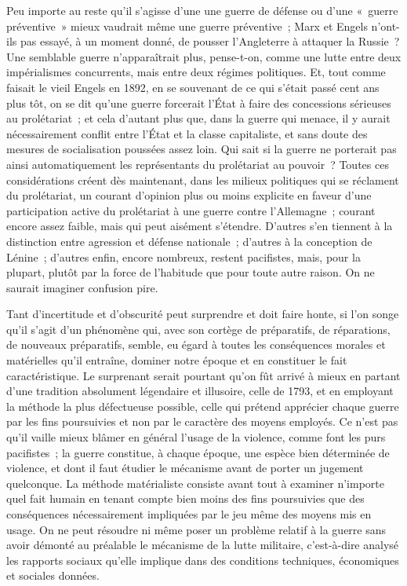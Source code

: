 \documentclass[french,twoside]{book} %
\begin{document}
Peu importe au reste qu'il s’agisse d'une une guerre de défense ou d’une « guerre préventive » mieux vaudrait même une guerre préventive ; Marx et Engels n'ont-ils pas essayé, à un moment donné, de pousser l'Angleterre à attaquer la Russie ? Une semblable guerre n'apparaîtrait plus, pense-t-on, com­me une lutte entre deux impérialismes concurrents, mais entre deux régimes politiques. Et, tout comme faisait le vieil Engels en 1892, en se souvenant de ce qui s'était passé cent ans plus tôt, on se dit qu'une guerre forcerait l'État à faire des concessions sérieuses au prolétariat ; et cela d'autant plus que, dans la guerre qui menace, il y aurait nécessairement conflit entre l'État et la classe capitaliste, et sans doute des mesures de socialisation poussées assez loin. Qui sait si la guerre ne porterait pas ainsi automatiquement les représentants du prolétariat au pouvoir ? Toutes ces considérations créent dès maintenant, dans les milieux politiques qui se réclament du prolétariat, un courant d'opinion plus ou moins explicite en faveur d'une participation active du prolétariat à une guerre contre l'Allemagne ; courant encore assez faible, mais qui peut aisément s'étendre. D'autres s'en tiennent à la distinction entre agression et défense nationale ; d'autres à la conception de Lénine ; d'autres enfin, encore nombreux, restent pacifistes, mais, pour la plupart, plutôt par la force de l'habitude que pour toute autre raison. On ne saurait imaginer confusion pire.\par
Tant d'incertitude et d'obscurité peut surprendre et doit faire honte, si l'on songe qu'il s'agit d'un phénomène qui, avec son cortège de préparatifs, de réparations, de nouveaux préparatifs, semble, eu égard à toutes les consé­quences morales et matérielles qu'il entraîne, dominer notre époque et en constituer le fait caractéristique. Le surprenant serait pourtant qu'on fût arrivé à mieux en partant d'une tradition absolument légendaire et illusoire, celle de 1793, et en employant la méthode la plus défectueuse possible, celle qui prétend apprécier chaque guerre par les fins poursuivies et non par le caractère des moyens employés. Ce n'est pas qu'il vaille mieux blâmer en général l'usage de la violence, comme font les purs pacifistes ; la guerre constitue, à chaque époque, une espèce bien déterminée de violence, et dont il faut étudier le mécanisme avant de porter un jugement quelconque. La méthode matéria­liste consiste avant tout à examiner n'importe quel fait humain en tenant compte bien moins des fins poursuivies que des conséquences nécessairement impliquées par le jeu même des moyens mis en usage. On ne peut résoudre ni même poser un problème relatif à la guerre sans avoir démonté au préalable le mécanisme de la lutte militaire, c'est-à-dire analysé les rapports sociaux qu'elle implique dans des conditions techniques, économiques et sociales données.\par
\end{document}
